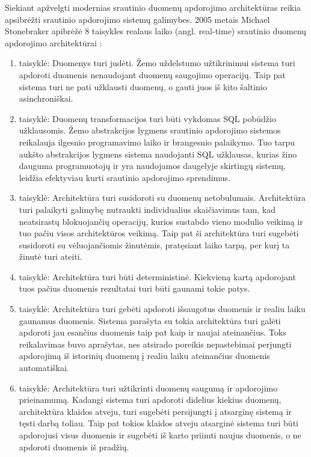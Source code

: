 \documentclass{VUMIFPSbakalaurinis}
\begin{document}
Siekiant apžvelgti modernias srautinio duomenų apdorojimo architektūras reikia apsibrėžti srautinio apdorojimo sistemų galimybes.
2005 metais Michael Stonebraker apibrėžė 8 taisykles realaus laiko (angl. real-time) srautinio duomenų apdorojimo architektūrai \cite{stonebraker20058}:
\begin{enumerate}[label=\arabic*]
    \item taisyklė: Duomenys turi judėti. Žemo uždelstumo užtikrinimui sistema turi apdoroti duomenis nenaudojant duomenų saugojimo operacijų. 
    Taip pat sistema turi ne pati užklausti duomenų, o gauti juos iš kito šaltinio asinchroniškai. 
    \item taisyklė: Duomenų transformacijos turi būti vykdomas SQL pobūdžio užklausomis. Žemo abstrakcijos lygmens srautinio apdorojimo sistemos reikalauja ilgesnio 
    programavimo laiko ir brangesnio palaikymo. Tuo tarpu aukšto abstrakcijos lygmens sistema naudojanti SQL užklausas, kurias žino dauguma programuotojų ir yra naudojamos daugelyje skirtingų sistemų, leidžia efektyviau kurti srautinio apdorojimo sprendimus.
    \item taisyklė: Architektūra turi susidoroti su duomenų netobulumais. Architektūra turi palaikyti galimybę nutraukti individualius skaičiavimus tam, kad neatsirastų blokuojančių operacijų, kurios sustabdo vieno modulio veikimą ir tuo pačiu visos architektūros veikimą. Taip pat ši architektūra turi sugebėti susidoroti su vėluojančiomis žinutėmis, pratęsiant laiko tarpą, per kurį ta žinutė turi ateiti.
    \item taisyklė: Architektūra turi būti deterministinė. Kiekvieną kartą apdorojant tuos pačius duomenis rezultatai turi būti gaunami tokie patys.
    \item taisyklė: Architektūra turi gebėti apdoroti išsaugotus duomenis ir realiu laiku gaunamus duomenis. Sistema parašyta su tokia architektūra turi galėti apdoroti jau esančius duomenis taip pat kaip ir naujai ateinančius. Toks reikalavimas buvo aprašytas, nes atsirado poreikis nepastebimai perjungti apdorojimą iš istorinių duomenų į realiu laiku ateinančius duomenis automatiškai.
    \item taisyklė: Architektūra turi užtikrinti duomenų saugumą ir apdorojimo prieinamumą. Kadangi sistema turi apdoroti didelius kiekius duomenų, architektūra klaidos atveju, turi sugebėti persijungti į atsarginę sistemą ir tęsti darbą toliau. Taip pat tokios klaidos atveju atsarginė sistema turi būti apdorojusi visus duomenis ir sugebėti iš karto priimti naujus duomenis, o ne apdoroti duomenis iš pradžių.

\end{enumerate}
\end{document}
